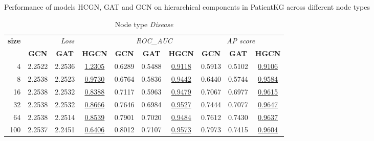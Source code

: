 \begin{table} 
    \centering
    \caption{Performance of models HCGN, GAT and GCN on hierarchical components in PatientKG across different node types}
    \label{tab:tabSubclassofPerf}  
    \begin{subtable}[t]{\textwidth}
        \centering
        \begin{tabular}{r|ccc|ccc|ccc}        
            \toprule
            \multirow{2}{*}{\textbf{size}} & \multicolumn{3}{c|}{\textit{Loss}} & \multicolumn{3}{c|}{\textit{ROC\_AUC}} & \multicolumn{3}{c}{\textit{AP score}} \\
            & \textbf{GCN} & \textbf{GAT} & \textbf{HGCN} & \textbf{GCN} & \textbf{GAT} & \textbf{HGCN} & \textbf{GCN} & \textbf{GAT} & \textbf{HGCN} \\
            \midrule
                4 & 2.2522 & 2.2536 & \underline{1.2305} & 0.6289 & 0.5488 & \underline{0.9118} & 0.5913 & 0.5102 & \underline{0.9106} \\  
                8 & 2.2538 & 2.2523 & \underline{0.9730} & 0.6764 & 0.5836 & \underline{0.9442} & 0.6440 & 0.5744 & \underline{0.9584} \\
                16 & 2.2538 & 2.2532 & \underline{0.8388} & 0.7117 & 0.5963 & \underline{0.9479} & 0.7067 & 0.6977 & \underline{0.9615} \\
                32 & 2.2538 & 2.2532 & \underline{0.8666} & 0.7646 & 0.6984 & \underline{0.9527} & 0.7444 & 0.7077 & \underline{0.9647} \\
                64 & 2.2538 & 2.2514 & \underline{0.8539} & 0.7901 & 0.7020 & \underline{0.9484} & 0.7612 & 0.7430 & \underline{0.9637} \\
                100 & 2.2537 & 2.2451 & \underline{0.6406} & 0.8012 & 0.7107 & \underline{0.9573} & 0.7973 & 0.7415 & \underline{0.9604} \\
            \bottomrule
        \end{tabular}
        \caption{Node type \textit{Disease}}
    \end{subtable}
    
    \vspace{1em}
    

\end{table}
